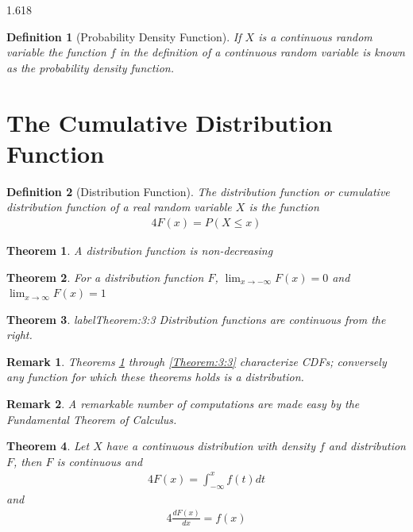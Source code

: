 \documentclass[11pt, oneside]{book}   	%
\newtheorem{definition}{Definition}[chapter]
\newtheorem{remark}{Remark}[chapter]
\newtheorem{theorem}{Theorem}[chapter]
\begin{document}
\begin{spacing}{1.618}
			\begin{definition}[Probability Density Function]
				If $X$ is a continuous random variable the function $f$ in the definition of a continuous random variable is known as the \emph{probability density function}. 
			\end{definition}

	\section{The Cumulative Distribution Function}
	
		\begin{definition}[Distribution Function]
			The \emph{distribution function} or \emph{cumulative distribution function} of a real random variable $X$ is the function 
			\begin{alignat}{4}
				F(x)=P(X\leq x)
			\end{alignat}
		\end{definition}	

		\begin{theorem}\label{Theorem:3:1}
			A distribution function is non-decreasing
		\end{theorem}
		
		\begin{theorem}\label{Theorem:3:2}
			For a distribution function $F$, $\lim_{x\to-\infty}F(x)=0$ and $\lim_{x\to\infty}F(x)=1$
		\end{theorem}

		\begin{theorem}label{Theorem:3:3}
			Distribution functions are continuous from the right.
		\end{theorem}
		
		\begin{remark}
			Theorems \ref{Theorem:3:1} through \ref{Theorem:3:3} characterize CDFs; conversely any function for which these theorems holds is a distribution. 
		\end{remark}
		\begin{remark}
			A remarkable number of computations are made easy by the Fundamental Theorem of Calculus. 
		\end{remark}

		\begin{theorem}
			Let $X$ have a continuous distribution with density $f$ and distribution $F$, then $F$ is continuous and 
			\begin{alignat}{4}
				F(x)=\int_{-\infty}^xf(t)dt
			\end{alignat}
			and
			\begin{alignat}{4}
				\frac{dF(x)}{dx} = f(x)
			\end{alignat}
		\end{theorem}


\end{spacing}
\end{document}
